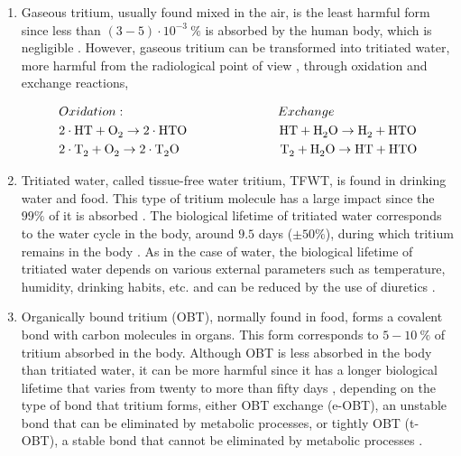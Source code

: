 \begin{enumerate}
\item{} Gaseous tritium, usually found mixed in the air, is the least harmful form since less than $(3-5) \cdot{} 10^{-3}~\%$ is absorbed by the human body, which is negligible \cite{TritiumHandling}. However, gaseous tritium can be transformed into tritiated water, more harmful from the radiological point of view \cite{TritiumHandling}, through oxidation and exchange reactions,

\begin{equation}
\begin{split}
& Oxidation: \qquad \qquad \qquad \qquad \qquad \qquad Exchange\\
& 2\cdot{}\ce{HT} + \ce{O_2} \rightarrow 2 \cdot{} \ce{HTO} ~ \quad \qquad \qquad \qquad \ce{HT} + \ce{H_2 O} \rightarrow \ce{H_2} + \ce{HTO}\\
& 2\cdot{}\ce{T_2} + \ce{O_2} \rightarrow 2 \cdot{} \ce{T_2 O} \qquad \qquad \qquad \qquad \ce{T_2} + \ce{H_2 O} \rightarrow \ce{HT} + \ce{HTO}
\label{eq:OxidationExchange}
\end{split}
\end{equation}

\item{} Tritiated water, called tissue-free water tritium, TFWT, is found in drinking water and food. This type of tritium molecule has a large impact since the $99\%$ of it is absorbed \cite{TritiumHandling}. The biological lifetime of tritiated water corresponds to the water cycle in the body, around $9.5$ days ($\pm50\%$), during which tritium remains in the body \cite{TritiumHandling, FranceTritiumEnvironment, EstimationTritiumDosi, TissueDistribution}. As in the case of water, the biological lifetime of tritiated water depends on various external parameters such as temperature, humidity, drinking habits, etc. and can be reduced by the use of diuretics \cite{TritiumHandling}.

\item{} Organically bound tritium (OBT), normally found in food, forms a covalent bond with carbon molecules in organs. This form corresponds to $5-10~\%$ of tritium absorbed in the body. Although OBT is less absorbed in the body than tritiated water, it can be more harmful since it has a longer biological lifetime that varies from twenty to more than fifty days \cite{EstimationTritiumDosiKangarooRats, TissueDistribution}, depending on the type of bond that tritium forms, either OBT exchange (e-OBT), an unstable bond that can be eliminated by metabolic processes, or tightly OBT (t-OBT), a stable bond that cannot be eliminated by metabolic processes \cite{FranceTritiumEnvironment, EstimationTritiumDosi, EstimationTritiumDosiRats, EstimationTritiumDosiKangarooRats}.
\end{enumerate}

